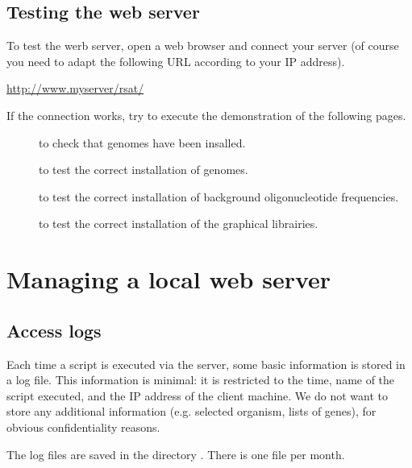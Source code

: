 \documentclass[12pt,a4paper, twoside]{scrreprt} %
\begin{document}


\subsection{Testing the web server}

To test the werb server, open a web browser and connect your \RSAT
server (of course you need to adapt the following URL according to
your IP address).

\url{http://www.myserver/rsat/} 

If the connection works, try to execute the demonstration of the
following pages.

\begin{description}
\item[] to check that genomes have
  been insalled.
  
\item[] to test the correct installation of
  genomes.

\item[] to test the correct installation of
  background oligonucleotide frequencies.

\item[] to test the correct installation of the
  graphical librairies.
\end{description}

\section{Managing a local web server}

\subsection{Access logs}

Each time a script is executed via the \RSAT server, some basic
information is stored in a log file. This information is minimal: it
is restricted to the time, name of the script executed, and the IP
address of the client machine. We do not want to store any additional
information (e.g. selected organism, lists of genes), for obvious
confidentiality reasons.

The log files are saved in the directory . There
is one file per month.
\end{document}
